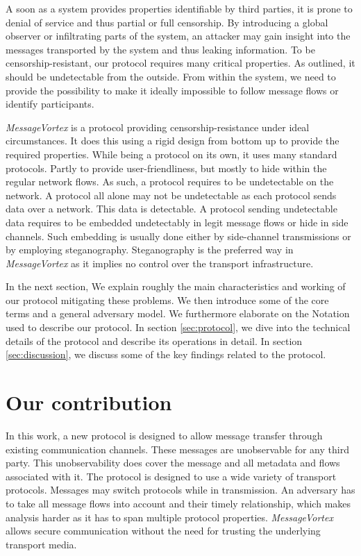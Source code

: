 \documentclass[acmsmall, screen]{acmart}
\begin{document}
A soon as a system provides properties identifiable by third parties, it is prone to denial of service and thus partial or full censorship. By introducing a global observer or infiltrating parts of the system, an attacker may gain insight into the messages transported by the system and thus leaking information. To be censorship-resistant, our protocol requires many critical properties. As outlined, it should be undetectable from the outside. From within the system, we need to provide the possibility to make it ideally impossible to follow message flows or identify participants.

\emph{MessageVortex} is a protocol providing censorship-resistance under ideal circumstances. It does this using a rigid design from bottom up to provide the required properties. While being a protocol on its own, it uses many standard protocols. Partly to provide user-friendliness, but mostly to hide within the regular network flows. As such, a protocol requires to be undetectable on the network. A protocol all alone may not be undetectable as each protocol sends data over a network. This data is detectable. A protocol sending undetectable data requires to be embedded undetectably in legit message flows or hide in side channels. Such embedding is usually done either by side-channel transmissions or by employing steganography. Steganography is the preferred way in \emph{MessageVortex} as it implies no control over the transport infrastructure.

In the next section, We explain roughly the main characteristics and working of our protocol mitigating these problems. We then introduce some of the core terms and a general adversary model. We furthermore elaborate on the Notation used to describe our protocol. In section \ref{sec:protocol}, we dive into the technical details of the protocol and describe its operations in detail. In section \ref{sec:discussion}, we discuss some of the key findings related to the protocol.

\section{Our contribution}
In this work, a new protocol is designed to allow message transfer through existing communication channels. These messages are unobservable for any third party. This unobservability does cover the message and all metadata and flows associated with it.  The protocol is designed to use a wide variety of transport protocols. Messages may switch protocols while in transmission. An adversary has to take all message flows into account and their timely relationship, which makes analysis harder as it has to span multiple protocol properties. \emph{MessageVortex} allows secure communication without the need for trusting the underlying transport media.
\end{document}
